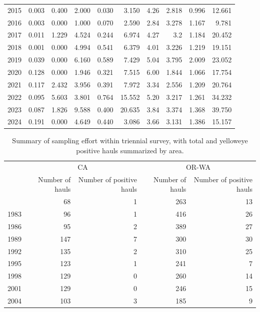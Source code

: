 \documentclass[
]{scrartcl}
\begin{document}
\begin{longtable}{rrrrrrrrrr}
2015 & 0.003 & 0.400 & 2.000 & 0.030 & 3.150 & 4.26 & 2.818 & 0.996 & 12.661 \\ 
2016 & 0.003 & 0.000 & 1.000 & 0.070 & 2.590 & 2.84 & 3.278 & 1.167 & 9.781 \\ 
2017 & 0.011 & 1.229 & 4.524 & 0.244 & 6.974 & 4.27 & 3.2 & 1.184 & 20.452 \\ 
2018 & 0.001 & 0.000 & 4.994 & 0.541 & 6.379 & 4.01 & 3.226 & 1.219 & 19.151 \\ 
2019 & 0.039 & 0.000 & 6.160 & 0.589 & 7.429 & 5.04 & 3.795 & 2.009 & 23.052 \\ 
2020 & 0.128 & 0.000 & 1.946 & 0.321 & 7.515 & 6.00 & 1.844 & 1.066 & 17.754 \\ 
2021 & 0.117 & 2.432 & 3.956 & 0.391 & 7.972 & 3.34 & 2.556 & 1.209 & 20.764 \\ 
2022 & 0.095 & 5.603 & 3.801 & 0.764 & 15.552 & 5.20 & 3.217 & 1.261 & 34.232 \\ 
2023 & 0.087 & 1.826 & 9.588 & 0.400 & 20.635 & 3.84 & 3.374 & 1.368 & 39.750 \\ 
2024 & 0.191 & 0.000 & 4.649 & 0.440 & 3.086 & 3.66 & 3.131 & 1.386 & 15.157 \\ 
\bottomrule

\end{longtable}

\endgroup

\begingroup
\fontsize{9.0pt}{10.8pt}\selectfont

\begin{longtable}{l|rrrr}

\caption{\label{tbl-sampling-effort-triennial}Summary of sampling effort
within triennial survey, with total and yelloweye positive hauls
summarized by area.}

\tabularnewline

\toprule
 & \multicolumn{2}{c}{CA} & \multicolumn{2}{c}{OR-WA} \\ 
\cmidrule(lr){2-3} \cmidrule(lr){4-5}
 & Number of hauls & Number of positive hauls & Number of hauls & Number of positive hauls \\ 
\midrule\addlinespace[2.5pt]
1980 & 68 & 1 & 263 & 13 \\ 
1983 & 96 & 1 & 416 & 26 \\ 
1986 & 95 & 2 & 389 & 27 \\ 
1989 & 147 & 7 & 300 & 30 \\ 
1992 & 135 & 2 & 310 & 25 \\ 
1995 & 123 & 1 & 241 & 7 \\ 
1998 & 129 & 0 & 260 & 14 \\ 
2001 & 129 & 0 & 246 & 15 \\ 
2004 & 103 & 3 & 185 & 9 \\ 
\bottomrule

\end{longtable}
\end{document}
